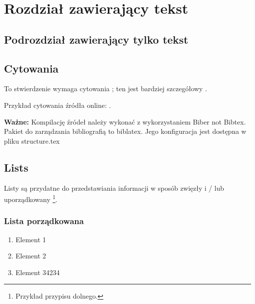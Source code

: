 
\chapter{Rozdział zawierający tekst}

\section{Podrozdział zawierający tylko tekst}

\lipsum[1-7] %


\section{Cytowania}


To stwierdzenie wymaga cytowania \cite{article_key}; ten jest bardziej szczegółowy \cite[162]{book_key}.

Przykład cytowania źródła online: 
\cite{knuthwebsite}.

{\bf Ważne:} Kompilację źródeł należy wykonać z wykorzystaniem Biber not Bibtex. Pakiet do zarządzania bibliografią to biblatex. Jego konfiguracja jest dostępna w pliku structure.tex


\section{Lists}

Listy są przydatne do przedstawiania informacji w sposób zwięzły i / lub uporządkowany \footnote{Przykład przypisu dolnego.}.

\subsection{Lista porządkowana}

\begin{enumerate}
\item Element 1
\item Element 2
\item Element 34234
\end{enumerate}


